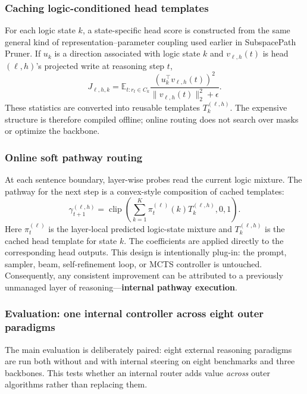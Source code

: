 \documentclass[12pt,a4paper]{article}
\newcommand{\method}[1]{{\sffamily\bfseries\color{MethodBlue}#1}}
\newcommand{\XDB}{\method{XDomainBench}}
\newcommand{\SubspacePath}{\method{SubspacePath Pruner}}
\def\method#1{#1}\def\XDB{XDomainBench}\def\SubspacePath{SubspacePath Pruner}%
\begin{document}
\subsubsection{Caching logic-conditioned head templates}
For each logic state $k$, a state-specific head score is constructed from the same general kind of representation--parameter coupling used earlier in \SubspacePath{}. If $u_k$ is a direction associated with logic state $k$ and $v_{\ell,h}(t)$ is head $(\ell,h)$'s projected write at reasoning step $t$,
\begin{equation}
J_{\ell,h,k}=\mathbb E_{t:r_t\in C_k}
\frac{(u_k^\top v_{\ell,h}(t))^2}{\|v_{\ell,h}(t)\|_2^2+\epsilon}.
\label{eq:lotr-importance}
\end{equation}
These statistics are converted into reusable templates $T_k^{(\ell,h)}$. The expensive structure is therefore compiled offline; online routing does not search over masks or optimize the backbone.

\subsubsection{Online soft pathway routing}
At each sentence boundary, layer-wise probes read the current logic mixture. The pathway for the next step is a convex-style composition of cached templates:
\begin{equation}
\gamma_{t+1}^{(\ell,h)}=
\operatorname{clip}\!\left(
\sum_{k=1}^{K}\pi_t^{(\ell)}(k)T_k^{(\ell,h)},0,1
\right).
\label{eq:lotr}
\end{equation}
Here $\pi_t^{(\ell)}$ is the layer-local predicted logic-state mixture and $T_k^{(\ell,h)}$ is the cached head template for state $k$. The coefficients are applied directly to the corresponding head outputs. This design is intentionally plug-in: the prompt, sampler, beam, self-refinement loop, or MCTS controller is untouched. Consequently, any consistent improvement can be attributed to a previously unmanaged layer of reasoning---\textbf{internal pathway execution}.

\subsubsection{Evaluation: one internal controller across eight outer paradigms}
The main evaluation is deliberately paired: eight external reasoning paradigms are run both without and with internal steering on eight benchmarks and three backbones. This tests whether an internal router adds value \emph{across} outer algorithms rather than replacing them.
\end{document}
